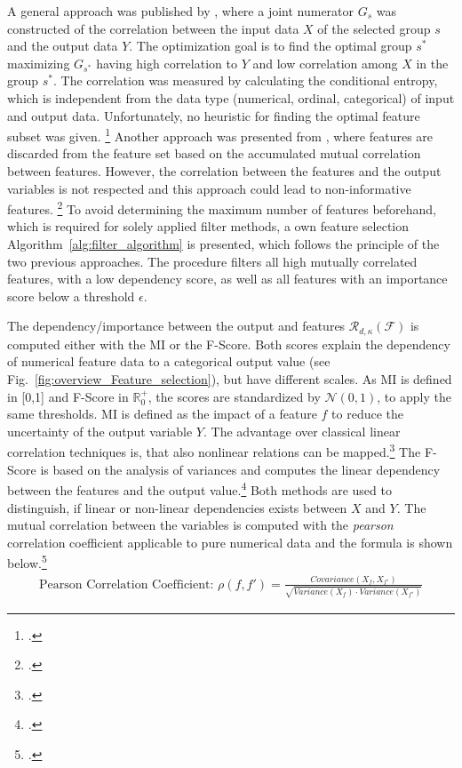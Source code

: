 A general approach was published by \cite{hall_feature_1997},
where a joint numerator $G_s$ was constructed of the correlation between the input data $X$ of the selected group $s$ and the output data $Y$.
The optimization goal is to find the optimal group $s^*$ maximizing $G_{s^*}$ having high correlation to $Y$ and low
correlation among $X$ in the group $s^*$. The correlation was measured by calculating the conditional entropy, which is independent
from the data type (numerical, ordinal, categorical) of input and output data. Unfortunately, no heuristic for finding the optimal
feature subset was given. \footcite[cf.][p. 856]{hall_feature_1997} Another approach was presented from \cite{haindl_feature_2006},
where features are discarded from the feature set based on the accumulated mutual correlation between features. However, the correlation between
the features and the output variables is not respected and this approach could lead to non-informative features. \footcite[cf.][]{haindl_feature_2006}
To avoid determining the maximum number of features beforehand, which is required for solely applied filter methods,
a own feature selection Algorithm~\ref{alg:filter_algorithm} is presented, which follows the principle of the two previous approaches.
The procedure filters all high mutually correlated features, with a low dependency score, as well as all features with an
importance score below a threshold $\epsilon$.



The dependency/importance between the output and features $\mathcal{R}_{d,\kappa}(\mathcal{F})$ is computed either with the
\gls{MI} or the \gls{F-Score}. Both scores explain the dependency of numerical feature data to a categorical output value (see Fig.~\ref{fig:overview_Feature_selection}),
but have different scales. As \gls{MI} is defined in [0,1] and \gls{F-Score} in $\mathbb{R}_0^+$, the scores are standardized by $\mathcal{N}(0,1)$, to
apply the same thresholds. \gls{MI} is defined as the impact of a feature $f$ to reduce the uncertainty of the output variable $Y$.
The advantage over classical linear correlation techniques is, that also nonlinear relations can be mapped.\footcite[cf.][p. 539f]{battiti_using_1994}
The \gls{F-Score} is based on the analysis of variances and computes the linear dependency between the features and the output value.\footcite[cf.][p. 2]{gu_generalized_2012}
Both methods are used to distinguish, if linear or non-linear dependencies exists between $X$ and $Y$. The mutual correlation between the variables
is computed with the \textit{pearson} correlation coefficient applicable to pure numerical data and the formula is shown below.\footcite[cf.][p. 17]{chandrashekar_survey_2014}
\begin{gather*}
	\text{Pearson Correlation Coefficient: } \rho(f,f') = \frac{Covariance(X_f,X_{f'})}{\sqrt{Variance(X_f)\cdot Variance(X_{f'})}}
\end{gather*}

